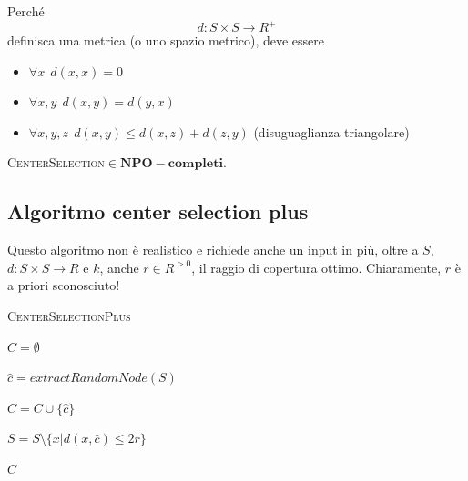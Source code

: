 \noindent
Perché $$
	d: S\times S \rightarrow R^{+}
$$
definisca una metrica (o uno spazio metrico), deve essere
\begin{itemize}
	\item $\forall x     ~~ d(x,x) = 0$
	\item $\forall x,y   ~~ d(x,y) = d(y,x)$
	\item $\forall x,y,z ~~ d(x,y) \leq d(x,z) + d(z,y)$ (disuguaglianza triangolare)
\end{itemize}

\begin{theorem}
	\textsc{CenterSelection}$\in \mathbf{NPO-completi}$.
\end{theorem}

\subsection{Algoritmo center selection plus}
Questo algoritmo non è realistico e richiede anche un input in più,
oltre a $S$, $d: S \times S \rightarrow R$ e $k$, anche $r \in R^{> 0}$, il
raggio di copertura ottimo. Chiaramente, $r$ è a priori sconosciuto!


\begin{algorithm}[h]
	\caption{\textsc{CenterSelectionPlus}}
	\label{algo:CenterSelectionPlus}

	$C = \emptyset$

	{
		$\hat{c} = extractRandomNode(S)$

		$C = C \cup \{\hat{c}\}$

		$S = S \setminus \{x | d(x, \hat{c}) \leq 2r\}$
	}
	{
		\Return $C$
	}
\end{algorithm}


